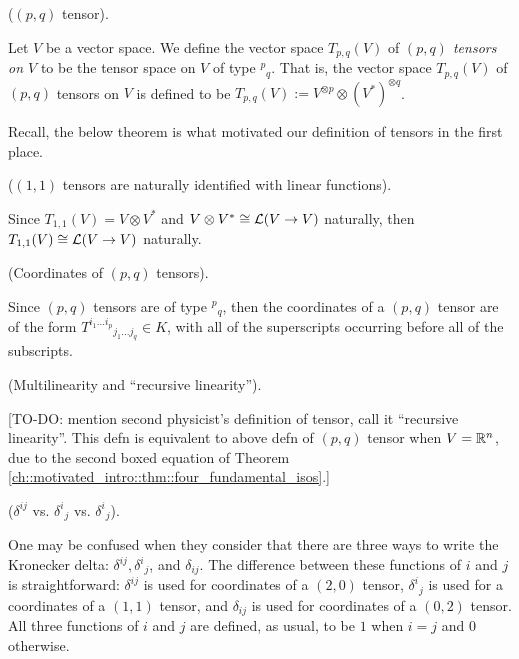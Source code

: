 \begin{defn}
    \label{ch::motivated_intro::defn::pq_tensor}
    
    ($(p, q)$ tensor).
    
    Let $V$ be a vector space. We define the vector space $T_{p,q}(V)$ of \textit{$(p, q)$ tensors on $V$} to be the tensor space on $V$ of type $^p{}_q$. That is, the vector space $T_{p,q}(V)$ of $(p, q)$ tensors on $V$ is defined to be $T_{p,q}(V) := V^{\otimes p} \otimes (V^*)^{\otimes q}$.
\end{defn}

Recall, the below theorem is what motivated our definition of tensors in the first place.

\begin{theorem}
    ($(1, 1)$ tensors are naturally identified with linear functions).
    
    Since $T_{1,1}(V) = V \otimes V^*$ and $V \otimes V^* \cong \mathcal{L}(V \rightarrow V)$ naturally, then $T_{1,1}(V) \cong \mathcal{L}(V \rightarrow V)$ naturally. 
\end{theorem}

\begin{remark}
    (Coordinates of $(p, q)$ tensors).

    Since $(p, q)$ tensors are of type $^p{}_q$, then the coordinates of a $(p, q)$ tensor are of the form $T^{i_1 ... i_p}{}_{j_1 ... j_q} \in K$, with all of the superscripts occurring before all of the subscripts.
\end{remark}

\begin{remark}
    (Multilinearity and ``recursive linearity'').
    
    [TO-DO: mention second physicist's definition of tensor, call it ``recursive linearity''. This defn is equivalent to above defn of $(p, q)$ tensor when $V = \mathbb{R}^n$, due to the second boxed equation of Theorem \ref{ch::motivated_intro::thm::four_fundamental_isos}.]
\end{remark}

\begin{remark}
    ($\delta^{ij}$ vs. $\delta^i{}_j$ vs. $\delta^i{}_j$).
    
    One may be confused when they consider that there are three ways to write the Kronecker delta: $\delta^{ij}, \delta^i{}_j$, and $\delta_{ij}$. The difference between these functions of $i$ and $j$ is straightforward: $\delta^{ij}$ is used for coordinates of a $(2, 0)$ tensor, $\delta^i{}_j$ is used for a coordinates of a $(1, 1)$ tensor, and $\delta_{ij}$ is used for coordinates of a $(0, 2)$ tensor. All three functions of $i$ and $j$ are defined, as usual, to be $1$ when $i = j$ and $0$ otherwise.
\end{remark}

